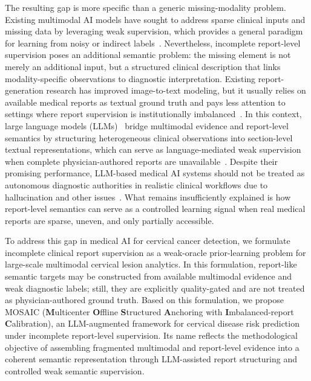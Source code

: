 \documentclass[11pt, a4paper]{article}
\theoremstyle{plain}
\theoremstyle{definition}
\begin{document}
The resulting gap is more specific than a generic missing-modality problem. Existing multimodal AI models have sought to address sparse clinical inputs and missing data by leveraging weak supervision, which provides a general paradigm for learning from noisy or indirect labels~\cite{aljorf2025medpatch,ratner2020snorkel}. Nevertheless, incomplete report-level supervision poses an additional semantic problem: the missing element is not merely an additional input, but a structured clinical description that links modality-specific observations to diagnostic interpretation. Existing report-generation research has improved image-to-text modeling, but it usually relies on available medical reports as textual ground truth and pays less attention to settings where report supervision is institutionally imbalanced~\cite{monshi2020radiology_reports,pang2023medical_report_generation}. In this context, large language models (LLMs)~\cite{vaswani2017attention,brown2020language} bridge multimodal evidence and report-level semantics by structuring heterogeneous clinical observations into section-level textual representations, which can serve as language-mediated weak supervision when complete physician-authored reports are unavailable~\cite{hager2024llm_limitations,thirunavukarasu2023large}. Despite their promising performance, LLM-based medical AI systems should not be treated as autonomous diagnostic authorities in realistic clinical workflows due to hallucination and other issues~\cite{thirunavukarasu2023llm_medicine}. What remains insufficiently explained is how report-level semantics can serve as a controlled learning signal when real medical reports are sparse, uneven, and only partially accessible.

To address this gap in medical AI for cervical cancer detection, we formulate incomplete clinical report supervision as a weak-oracle prior-learning problem for large-scale multimodal cervical lesion analytics. In this formulation, report-like semantic targets may be constructed from available multimodal evidence and weak diagnostic labels; still, they are explicitly quality-gated and are not treated as physician-authored ground truth. Based on this formulation, we propose MOSAIC (\textbf{M}ulticenter \textbf{O}ffline \textbf{S}tructured \textbf{A}nchoring with \textbf{I}mbalanced-report \textbf{C}alibration), an LLM-augmented framework for cervical disease risk prediction under incomplete report-level supervision. Its name reflects the methodological objective of assembling fragmented multimodal and report-level evidence into a coherent semantic representation through LLM-assisted report structuring and controlled weak semantic supervision.
\end{document}
